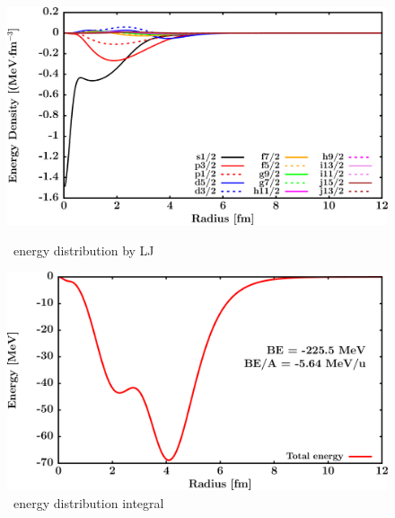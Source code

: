 \begin{figure}[hbtp]
    \centering
    \begin{minipage}{0.45\textwidth}
        \centering
        \includegraphics[width=\textwidth]{figures/ca40_EnergyDist.png}
        \caption*{\caForty\ energy distribution by LJ}
        \label{DOMFitData_ca40_proton_energyDistInt}
    \end{minipage}\hspace{6pt}
    \begin{minipage}{0.45\textwidth}
        \centering
        \includegraphics[width=\textwidth]{figures/ca40_EnergyDistIntegral.png}
        \caption*{\caForty\ energy distribution integral}
        \label{DOMFitData_ca40_neutron_energyDistInt}
    \end{minipage}
\end{figure}
\vspace{0.4in}
